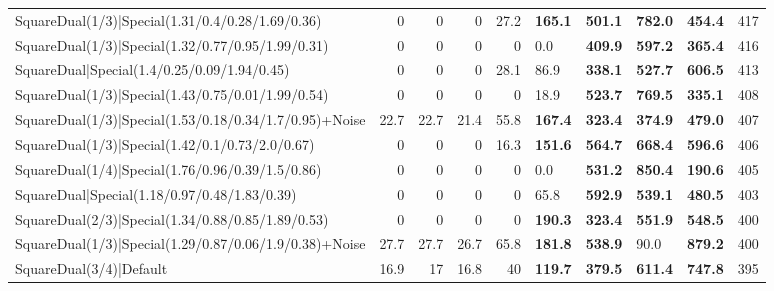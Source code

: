 \begin{tabular}{lrrrrllllr}
 SquareDual(1/3)|Special(1.31/0.4/0.28/1.69/0.36)        &          0   &          0   &          0   &            27.2 & \textbf{165.1} & \textbf{501.1} & \textbf{782.0} & \textbf{454.4}  &          417 \\
 SquareDual(1/3)|Special(1.32/0.77/0.95/1.99/0.31)       &          0   &          0   &          0   &             0   & 0.0            & \textbf{409.9} & \textbf{597.2} & \textbf{365.4}  &          416 \\
 SquareDual|Special(1.4/0.25/0.09/1.94/0.45)             &          0   &          0   &          0   &            28.1 & 86.9           & \textbf{338.1} & \textbf{527.7} & \textbf{606.5}  &          413 \\
 SquareDual(1/3)|Special(1.43/0.75/0.01/1.99/0.54)       &          0   &          0   &          0   &             0   & 18.9           & \textbf{523.7} & \textbf{769.5} & \textbf{335.1}  &          408 \\
 SquareDual(1/3)|Special(1.53/0.18/0.34/1.7/0.95)+Noise  &         22.7 &         22.7 &         21.4 &            55.8 & \textbf{167.4} & \textbf{323.4} & \textbf{374.9} & \textbf{479.0}  &          407 \\
 SquareDual(1/3)|Special(1.42/0.1/0.73/2.0/0.67)         &          0   &          0   &          0   &            16.3 & \textbf{151.6} & \textbf{564.7} & \textbf{668.4} & \textbf{596.6}  &          406 \\
 SquareDual(1/4)|Special(1.76/0.96/0.39/1.5/0.86)        &          0   &          0   &          0   &             0   & 0.0            & \textbf{531.2} & \textbf{850.4} & \textbf{190.6}  &          405 \\
 SquareDual|Special(1.18/0.97/0.48/1.83/0.39)            &          0   &          0   &          0   &             0   & 65.8           & \textbf{592.9} & \textbf{539.1} & \textbf{480.5}  &          403 \\
 SquareDual(2/3)|Special(1.34/0.88/0.85/1.89/0.53)       &          0   &          0   &          0   &             0   & \textbf{190.3} & \textbf{323.4} & \textbf{551.9} & \textbf{548.5}  &          400 \\
 SquareDual(1/3)|Special(1.29/0.87/0.06/1.9/0.38)+Noise  &         27.7 &         27.7 &         26.7 &            65.8 & \textbf{181.8} & \textbf{538.9} & 90.0           & \textbf{879.2}  &          400 \\
 SquareDual(3/4)|Default                                 &         16.9 &         17   &         16.8 &            40   & \textbf{119.7} & \textbf{379.5} & \textbf{611.4} & \textbf{747.8}  &          395 \\

\end{tabular}
